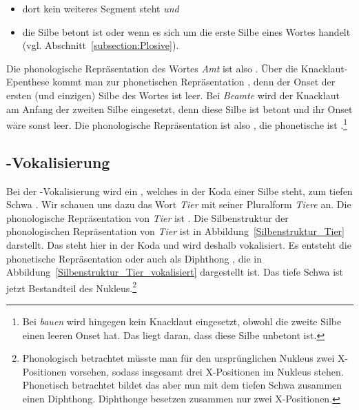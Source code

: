 \begin{itemize}
    \item dort kein weiteres Segment steht \textit{und}
    \item die Silbe betont ist oder wenn es sich um die erste Silbe eines Wortes handelt (vgl. Abschnitt~\ref{subsection:Plosive}).
\end{itemize}

Die phonologische Repräsentation des Wortes \textit{Amt} ist also . Über die Knacklaut-Epenthese kommt man zur phonetischen Repräsentation \textipa{[Pamt]}, denn der Onset der ersten (und einzigen) Silbe des Wortes ist leer. Bei \textit{Beamte} wird der Knacklaut am Anfang der zweiten Silbe eingesetzt, denn diese Silbe ist betont und ihr Onset wäre sonst leer. Die phonologische Repräsentation ist also , die phonetische ist .\footnote{Bei \textit{bauen} wird hingegen kein Knacklaut eingesetzt, obwohl die zweite Silbe einen leeren Onset hat. Das liegt daran, dass diese Silbe unbetont ist.}




\subsection{-Vokalisierung}
\label{subsec:r-Vokalisierung}

Bei der -Vokalisierung wird ein , welches in der Koda einer Silbe steht, zum tiefen Schwa \textipa{[5]}. Wir schauen uns dazu das Wort \textit{Tier} mit seiner Pluralform \textit{Tiere} an. Die phonologische Repräsentation von \textit{Tier} ist . Die Silbenstruktur der phonologischen Repräsentation von \textit{Tier} ist in Abbildung~\ref{Silbenstruktur_Tier} darstellt. Das  steht hier in der Koda und wird deshalb vokalisiert. Es entsteht die phonetische Repräsentation \textipa{[ti:5]} oder auch als Diphthong \textipa{[t\t*{i5}]}, die in Abbildung~\ref{Silbenstruktur_Tier_vokalisiert} dargestellt ist. Das tiefe Schwa ist jetzt Bestandteil des Nukleus.\footnote{Phonologisch betrachtet müsste man für den ursprünglichen Nukleus  zwei X-Positionen vorsehen, sodass insgesamt drei X-Positionen im Nukleus stehen. Phonetisch betrachtet bildet das  aber nun mit dem tiefen Schwa zusammen einen Diphthong. Diphthonge besetzen zusammen nur zwei X-Positionen.}

